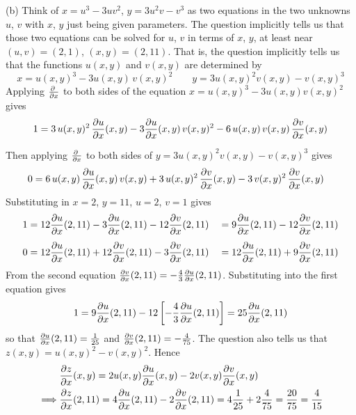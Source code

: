\begin{solution}
(b) 
Think of $x=u^3-3uv^2$, $y=3u^2v-v^3$ as two equations in the two 
    unknowns $u$, $v$ with $x$, $y$ just being given parameters. The
    question implicitly tells us that those two equations can be solved
    for $u$, $v$ in terms of $x$, $y$, at least near
    $(u,v)=(2,1)$, $(x,y)=(2,11)$. That is, the question implicitly
    tells us that the functions $u(x,y)$ and $v(x,y)$ are determined by
\begin{equation*}
x=u(x,y)^3-3u(x,y)\,v(x,y)^2\qquad
y=3u(x,y)^2v(x,y)-v(x,y)^3
\end{equation*}
Applying $\pdiff{}{x}$ to both sides of the equation
$x=u(x,y)^3-3u(x,y)v(x,y)^2$ gives
\begin{align*}
1&=3\,u(x,y)^2\,\pdiff{u}{x}(x,y)
       -3\pdiff{u}{x}(x,y)\,v(x,y)^2
       -6\,u(x,y)\,v(x,y)\,\pdiff{v}{x}(x,y) \\[0.05in]
\end{align*}
Then applying $\pdiff{}{x}$ to both sides of $y=3u(x,y)^2v(x,y)-v(x,y)^3$ gives
\begin{align*}
0&=6\,u(x,y)\,\pdiff{u}{x}(x,y)\,v(x,y)
   +3\,u(x,y)^2\,\pdiff{v}{x}(x,y)
   -3\,v(x,y)^2\,\pdiff{v}{x}(x,y)
\end{align*}
Substituting in $x=2$, $y=11$, $u=2$, $v=1$ gives
\begin{alignat*}{3}
1&=12\pdiff{u}{x}(2,11)
       -3\pdiff{u}{x}(2,11)
       -12\pdiff{v}{x}(2,11)
&&=9\pdiff{u}{x}(2,11)
       -12\pdiff{v}{x}(2,11)\\[0.05in]
0&=12\pdiff{u}{x}(2,11)
   +12\pdiff{v}{x}(2,11)
   -3\pdiff{v}{x}(2,11)
&&=12\pdiff{u}{x}(2,11)
   +9\pdiff{v}{x}(2,11)
\end{alignat*}
From the second equation $\pdiff{v}{x}(2,11)
=-\frac{4}{3}\pdiff{u}{x}(2,11)$. Substituting into the
first equation gives 
\begin{equation*}
1=9\pdiff{u}{x}(2,11)
       -12\left[-\frac{4}{3}\pdiff{u}{x}(2,11)\right]
= 25\pdiff{u}{x}(2,11)
\end{equation*}
so that $\pdiff{u}{x}(2,11)=\frac{1}{25}$
and $\pdiff{v}{x}(2,11)=-\frac{4}{75}$.
The question also tells us that $z(x,y)=u(x,y)^2-v(x,y)^2$.
Hence
\begin{align*}
&\pdiff{z}{x}(x,y)
=2u(x,y)\pdiff{u}{x}(x,y)
    -2v(x,y)\pdiff{v}{x}(x,y)\\
\implies &
\pdiff{z}{x}(2,11)
=4\pdiff{u}{x}(2,11)
    -2\pdiff{v}{x}(2,11)
=4\frac{1}{25}+2\frac{4}{75}=\frac{20}{75}
=\frac{4}{15}
\end{align*}
\end{solution}

